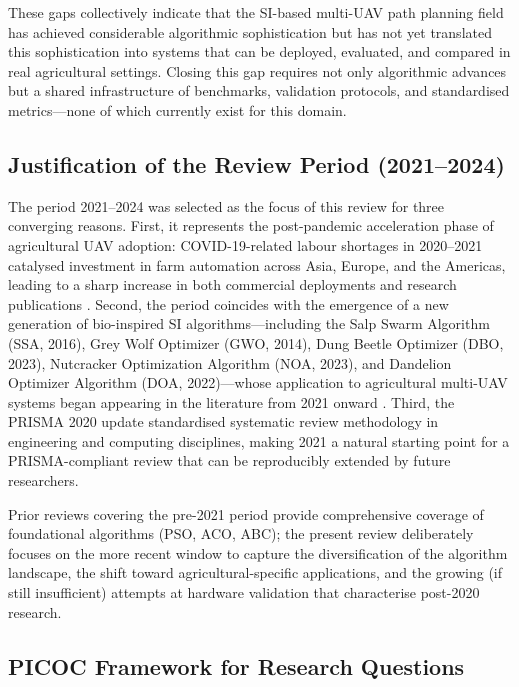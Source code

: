 \documentclass[review,3p,times]{elsarticle}
\begin{document}
\begin{itemize}
{These gaps collectively indicate that the SI-based multi-UAV path planning field has achieved considerable algorithmic sophistication but has not yet translated this sophistication into systems that can be deployed, evaluated, and compared in real agricultural settings. Closing this gap requires not only algorithmic advances but a shared infrastructure of benchmarks, validation protocols, and standardised metrics---none of which currently exist for this domain.

\subsection{Justification of the Review Period (2021--2024)}

The period 2021--2024 was selected as the focus of this review for three converging reasons. First, it represents the post-pandemic acceleration phase of agricultural UAV adoption: COVID-19-related labour shortages in 2020--2021 catalysed investment in farm automation across Asia, Europe, and the Americas, leading to a sharp increase in both commercial deployments and research publications \cite{tsouros2019,mogili2018}. Second, the period coincides with the emergence of a new generation of bio-inspired SI algorithms---including the Salp Swarm Algorithm (SSA, 2016), Grey Wolf Optimizer (GWO, 2014), Dung Beetle Optimizer (DBO, 2023), Nutcracker Optimization Algorithm (NOA, 2023), and Dandelion Optimizer Algorithm (DOA, 2022)---whose application to agricultural multi-UAV systems began appearing in the literature from 2021 onward . Third, the PRISMA 2020 update \cite{page2021} standardised systematic review methodology in engineering and computing disciplines, making 2021 a natural starting point for a PRISMA-compliant review that can be reproducibly extended by future researchers.

Prior reviews covering the pre-2021 period \cite{chung2018,puente2022,sharma2022,aitsaadi2022} provide comprehensive coverage of foundational algorithms (PSO, ACO, ABC); the present review deliberately focuses on the more recent window to capture the diversification of the algorithm landscape, the shift toward agricultural-specific applications, and the growing (if still insufficient) attempts at hardware validation that characterise post-2020 research.

\subsection{PICOC Framework for Research Questions}
\label{subsec:picoc}

}
\end{itemize}
\end{document}
